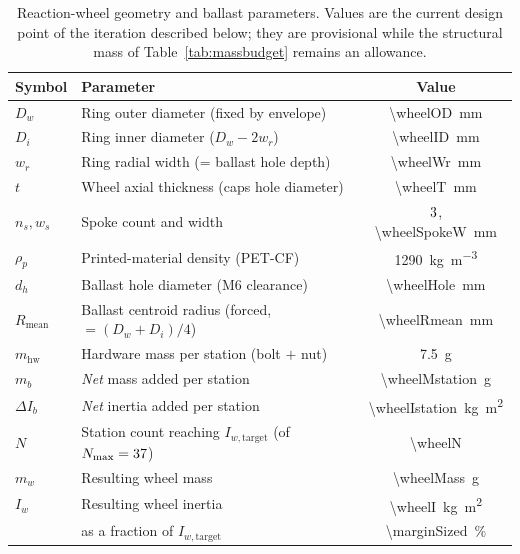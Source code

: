 \begin{table}[htbp]
\centering
\caption[Reaction-wheel geometry and ballast parameters]{Reaction-wheel
geometry and ballast parameters. Values are the current design point of the
iteration described below; they are provisional while the structural mass of
Table~\ref{tab:massbudget} remains an allowance.}
\label{tab:rw_params}
\small
\begin{tabular}{l L{6.4cm} c}
\toprule
Symbol & Parameter & Value \\
\midrule
$D_w$      & Ring outer diameter (fixed by envelope)   & \qty{\wheelOD}{\milli\metre} \\
$D_i$      & Ring inner diameter ($D_w - 2w_r$)        & \qty{\wheelID}{\milli\metre} \\
$w_r$      & Ring radial width (= ballast hole depth)  & \qty{\wheelWr}{\milli\metre} \\
$t$        & Wheel axial thickness (caps hole diameter) & \qty{\wheelT}{\milli\metre} \\
$n_s, w_s$ & Spoke count and width                     & $3$, \qty{\wheelSpokeW}{\milli\metre} \\
$\rho_p$   & Printed-material density (PET-CF)          & \qty{1290}{\kilo\gram\per\metre\cubed} \\
$d_h$      & Ballast hole diameter (M6 clearance)      & \qty{\wheelHole}{\milli\metre} \\
$R_{\text{mean}}$ & Ballast centroid radius (forced, $=(D_w{+}D_i)/4$) & \qty{\wheelRmean}{\milli\metre} \\
$m_{\text{hw}}$ & Hardware mass per station (bolt $+$ nut) & \qty{7.5}{\gram} \\
$m_b$      & \emph{Net} mass added per station          & \qty{\wheelMstation}{\gram} \\
$\Delta I_b$ & \emph{Net} inertia added per station     & \qty{\wheelIstation}{\kilogram\metre\squared} \\
$N$        & Station count reaching $I_{w,\text{target}}$ (of $N_{\max}=37$) & \num{\wheelN} \\
$m_w$      & Resulting wheel mass                      & \qty{\wheelMass}{\gram} \\
$I_w$      & Resulting wheel inertia                   & \qty{\wheelI}{\kilogram\metre\squared} \\
           & \quad as a fraction of $I_{w,\text{target}}$ & \qty{\marginSized}{\percent} \\
\bottomrule
\end{tabular}
\end{table}

